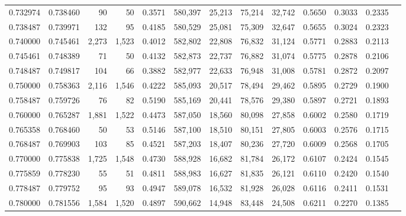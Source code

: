 \begin{tabular}{rrrrrrrrrrrrr}
0.732974 & 0.738460 &     90 &    50 &                                     0.3571 & 580,397 &  25,213 &  75,214 &  32,742 & 0.5650 & 0.3033 & 0.2335 \\
0.738487 & 0.739971 &    132 &    95 &                                     0.4185 & 580,529 &  25,081 &  75,309 &  32,647 & 0.5655 & 0.3024 & 0.2323 \\
0.740000 & 0.745461 &  2,273 & 1,523 &                                     0.4012 & 582,802 &  22,808 &  76,832 &  31,124 & 0.5771 & 0.2883 & 0.2113 \\
0.745461 & 0.748389 &     71 &    50 &                                     0.4132 & 582,873 &  22,737 &  76,882 &  31,074 & 0.5775 & 0.2878 & 0.2106 \\
0.748487 & 0.749817 &    104 &    66 &                                     0.3882 & 582,977 &  22,633 &  76,948 &  31,008 & 0.5781 & 0.2872 & 0.2097 \\
0.750000 & 0.758363 &  2,116 & 1,546 &                                     0.4222 & 585,093 &  20,517 &  78,494 &  29,462 & 0.5895 & 0.2729 & 0.1900 \\
0.758487 & 0.759726 &     76 &    82 &                                     0.5190 & 585,169 &  20,441 &  78,576 &  29,380 & 0.5897 & 0.2721 & 0.1893 \\
0.760000 & 0.765287 &  1,881 & 1,522 &                                     0.4473 & 587,050 &  18,560 &  80,098 &  27,858 & 0.6002 & 0.2580 & 0.1719 \\
0.765358 & 0.768460 &     50 &    53 &                                     0.5146 & 587,100 &  18,510 &  80,151 &  27,805 & 0.6003 & 0.2576 & 0.1715 \\
0.768487 & 0.769903 &    103 &    85 &                                     0.4521 & 587,203 &  18,407 &  80,236 &  27,720 & 0.6009 & 0.2568 & 0.1705 \\
0.770000 & 0.775838 &  1,725 & 1,548 &                                     0.4730 & 588,928 &  16,682 &  81,784 &  26,172 & 0.6107 & 0.2424 & 0.1545 \\
0.775859 & 0.778230 &     55 &    51 &                                     0.4811 & 588,983 &  16,627 &  81,835 &  26,121 & 0.6110 & 0.2420 & 0.1540 \\
0.778487 & 0.779752 &     95 &    93 &                                     0.4947 & 589,078 &  16,532 &  81,928 &  26,028 & 0.6116 & 0.2411 & 0.1531 \\
0.780000 & 0.781556 &  1,584 & 1,520 &                                     0.4897 & 590,662 &  14,948 &  83,448 &  24,508 & 0.6211 & 0.2270 & 0.1385 \\

\end{tabular}

